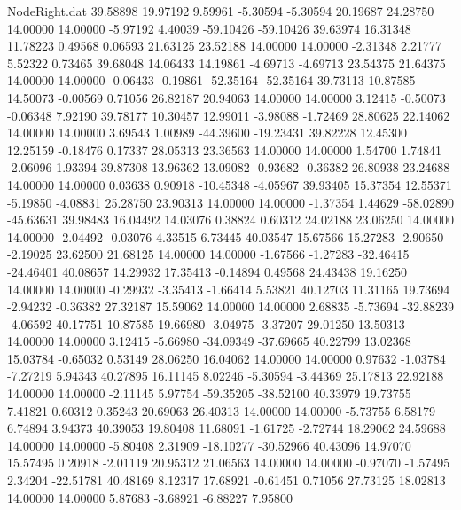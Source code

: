 \begin{filecontents}{NodeRight.dat}
  39.58898   19.97192    9.59961    -5.30594   -5.30594   20.19687   24.28750   14.00000   14.00000   -5.97192    4.40039  -59.10426  -59.10426
  39.63974   16.31348   11.78223     0.49568    0.06593   21.63125   23.52188   14.00000   14.00000   -2.31348    2.21777    5.52322    0.73465
  39.68048   14.06433   14.19861    -4.69713   -4.69713   23.54375   21.64375   14.00000   14.00000   -0.06433   -0.19861  -52.35164  -52.35164
  39.73113   10.87585   14.50073    -0.00569    0.71056   26.82187   20.94063   14.00000   14.00000    3.12415   -0.50073   -0.06348    7.92190
  39.78177   10.30457   12.99011    -3.98088   -1.72469   28.80625   22.14062   14.00000   14.00000    3.69543    1.00989  -44.39600  -19.23431
  39.82228   12.45300   12.25159    -0.18476    0.17337   28.05313   23.36563   14.00000   14.00000    1.54700    1.74841   -2.06096    1.93394
  39.87308   13.96362   13.09082    -0.93682   -0.36382   26.80938   23.24688   14.00000   14.00000    0.03638    0.90918  -10.45348   -4.05967
  39.93405   15.37354   12.55371    -5.19850   -4.08831   25.28750   23.90313   14.00000   14.00000   -1.37354    1.44629  -58.02890  -45.63631
  39.98483   16.04492   14.03076     0.38824    0.60312   24.02188   23.06250   14.00000   14.00000   -2.04492   -0.03076    4.33515    6.73445
  40.03547   15.67566   15.27283    -2.90650   -2.19025   23.62500   21.68125   14.00000   14.00000   -1.67566   -1.27283  -32.46415  -24.46401
  40.08657   14.29932   17.35413    -0.14894    0.49568   24.43438   19.16250   14.00000   14.00000   -0.29932   -3.35413   -1.66414    5.53821
  40.12703   11.31165   19.73694    -2.94232   -0.36382   27.32187   15.59062   14.00000   14.00000    2.68835   -5.73694  -32.88239   -4.06592
  40.17751   10.87585   19.66980    -3.04975   -3.37207   29.01250   13.50313   14.00000   14.00000    3.12415   -5.66980  -34.09349  -37.69665
  40.22799   13.02368   15.03784    -0.65032    0.53149   28.06250   16.04062   14.00000   14.00000    0.97632   -1.03784   -7.27219    5.94343
  40.27895   16.11145    8.02246    -5.30594   -3.44369   25.17813   22.92188   14.00000   14.00000   -2.11145    5.97754  -59.35205  -38.52100
  40.33979   19.73755    7.41821     0.60312    0.35243   20.69063   26.40313   14.00000   14.00000   -5.73755    6.58179    6.74894    3.94373
  40.39053   19.80408   11.68091    -1.61725   -2.72744   18.29062   24.59688   14.00000   14.00000   -5.80408    2.31909  -18.10277  -30.52966
  40.43096   14.97070   15.57495     0.20918   -2.01119   20.95312   21.06563   14.00000   14.00000   -0.97070   -1.57495    2.34204  -22.51781
  40.48169    8.12317   17.68921    -0.61451    0.71056   27.73125   18.02813   14.00000   14.00000    5.87683   -3.68921   -6.88227    7.95800

\end{filecontents}
